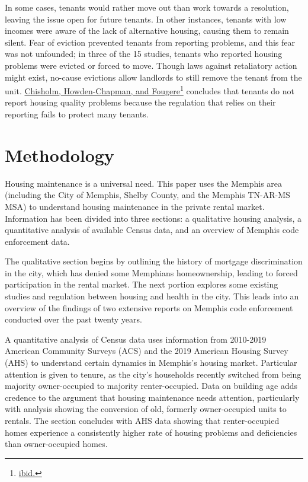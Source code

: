 \documentclass[
  openany]{book}
\begin{document}
In some cases, tenants would rather move out than work towards a resolution, leaving the issue open for future tenants. In other instances, tenants with low incomes were aware of the lack of alternative housing, causing them to remain silent. Fear of eviction prevented tenants from reporting problems, and this fear was not unfounded; in three of the 15 studies, tenants who reported housing problems were evicted or forced to move. Though laws against retaliatory action might exist, no-cause evictions allow landlords to still remove the tenant from the unit. \protect\hyperlink{ref-chisholm2018}{Chisholm, Howden-Chapman, and Fougere}\footnote{\protect\hyperlink{ref-chisholm2018}{ibid.}} concludes that tenants do not report housing quality problems because the regulation that relies on their reporting fails to protect many tenants.

\hypertarget{methodology}{%
\chapter{Methodology}\label{methodology}}

Housing maintenance is a universal need. This paper uses the Memphis area (including the City of Memphis, Shelby County, and the Memphis TN-AR-MS MSA) to understand housing maintenance in the private rental market. Information has been divided into three sections: a qualitative housing analysis, a quantitative analysis of available Census data, and an overview of Memphis code enforcement data.

The qualitative section begins by outlining the history of mortgage discrimination in the city, which has denied some Memphians homeownership, leading to forced participation in the rental market. The next portion explores some existing studies and regulation between housing and health in the city. This leads into an overview of the findings of two extensive reports on Memphis code enforcement conducted over the past twenty years.

A quantitative analysis of Census data uses information from 2010-2019 American Community Surveys (ACS) and the 2019 American Housing Survey (AHS) to understand certain dynamics in Memphis's housing market. Particular attention is given to tenure, as the city's households recently switched from being majority owner-occupied to majority renter-occupied. Data on building age adds credence to the argument that housing maintenance needs attention, particularly with analysis showing the conversion of old, formerly owner-occupied units to rentals. The section concludes with AHS data showing that renter-occupied homes experience a consistently higher rate of housing problems and deficiencies than owner-occupied homes.
\end{document}
